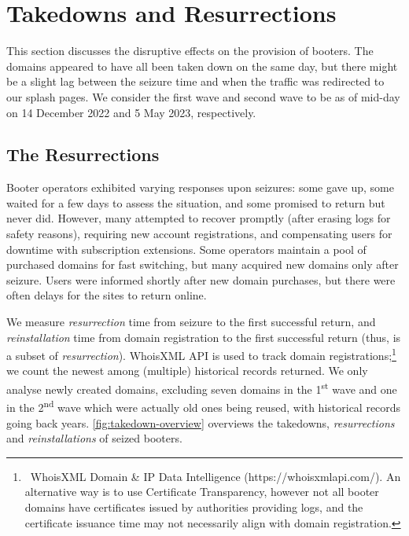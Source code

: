 \documentclass[letterpaper,twocolumn,10pt]{article}
\begin{document}
\section{Takedowns and Resurrections} \label{sec:takedown-resurrection}
This section discusses the disruptive effects on the provision of booters. The domains appeared to have all been taken down on the same day, but there might be a slight lag between the seizure time and when the traffic was redirected to our splash pages. We consider the first wave and second wave to be as of mid-day on 14 December 2022 and 5 May 2023, respectively.

\subsection{The Resurrections} \label{subsec:booter-resurrections}
Booter operators exhibited varying responses upon seizures: some gave up, some waited for a few days to assess the situation, and some promised to return but never did. However, many attempted to recover promptly (after erasing logs for safety reasons), requiring new account registrations, and compensating users for downtime with subscription extensions. Some operators maintain a pool of purchased domains for fast switching, but many acquired new domains only after seizure. Users were informed shortly after new domain purchases, but there were often delays for the sites to return online.

We measure \textit{resurrection} time from seizure to the first successful return, and \textit{reinstallation} time from domain registration to the first successful return (thus, is a subset of \textit{resurrection}). WhoisXML API is used to track domain registrations;\footnote{~WhoisXML Domain \& IP Data Intelligence (https://whoisxmlapi.com/). An alternative way is to use Certificate Transparency, however not all booter domains have certificates issued by authorities providing logs, and the certificate issuance time may not necessarily align with domain registration.} we count the newest among (multiple) historical records returned. We only analyse newly created domains, excluding seven domains in the 1\textsuperscript{st} wave and one in the 2\textsuperscript{nd} wave which were actually old ones being reused, with historical records going back years. \autoref{fig:takedown-overview} overviews the takedowns, \textit{resurrections} and \textit{reinstallations} of seized booters. 
\end{document}
